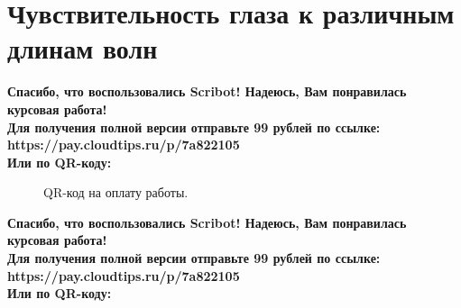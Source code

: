 \documentclass{article}
\begin{document}
\section{Чувствительность глаза к различным длинам волн}
\begin{center}
    \textbf{
        Спасибо, что воспользовались Scribot! Надеюсь, Вам понравилась курсовая работа!\\
        Для получения полной версии отправьте 99 рублей по ссылке:\\
        https://pay.cloudtips.ru/p/7a822105\\
        Или по QR-коду:\\
    }
\end{center}
\begin{figure}[h]
    \caption{QR-код на оплату работы.}
    \label{ris:image}
\end{figure}
\newpage
\begin{center}
    \textbf{
        Спасибо, что воспользовались Scribot! Надеюсь, Вам понравилась курсовая работа!\\
        Для получения полной версии отправьте 99 рублей по ссылке:\\
        https://pay.cloudtips.ru/p/7a822105\\
        Или по QR-коду:\\
    }
\end{center}
\end{document}
